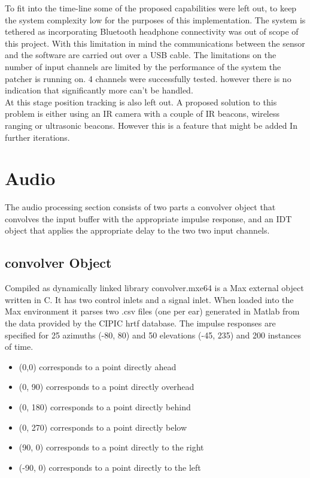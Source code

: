 \documentclass[a4paper,12pt,oneside]{article}
\begin{document}
To fit into the time-line some of the proposed capabilities were left out, to keep the system complexity low for the purposes of this implementation. The system is tethered as incorporating Bluetooth headphone connectivity was out of scope of this project. With this limitation in mind the communications between the sensor and the software are carried out over a USB cable. The limitations on the number of input channels are limited by the performance of the system the patcher is running on. 4 channels were successfully tested. however there is no indication that significantly more can't be handled.\\ 

At this stage position tracking is also left out. A proposed solution to this problem is either using an IR camera with a couple of IR beacons, wireless ranging or ultrasonic beacons. However this is a feature that might be added In further iterations.\\

\section*{Audio}

The audio processing section consists of two parts a convolver object that convolves the input buffer with the appropriate impulse response, and an IDT object that applies the appropriate delay to the two two input channels.


\subsection{convolver Object}

Compiled as dynamically linked library convolver.mxe64 is a Max external object written in C. It has two control inlets and a signal inlet. When loaded into the Max environment it parses two .csv files (one per ear) generated in Matlab from the data provided by the CIPIC hrtf database. The impulse responses are specified for 25 azimuths (-80\degree , 80\degree ) and 50 elevations (-45\degree , 235\degree ) and 200 instances of time.\\

\begin{itemize}
\item (0\degree ,0\degree ) corresponds to a point directly ahead
\item (0\degree , 90\degree ) corresponds to a point directly overhead
\item (0\degree , 180\degree ) corresponds to a point directly behind
\item (0\degree , 270\degree ) corresponds to a point directly below
\item (90\degree , 0\degree ) corresponds to a point directly to the right
\item (-90\degree , 0\degree ) corresponds to a point directly to the left
\end{itemize}
\end{document}
